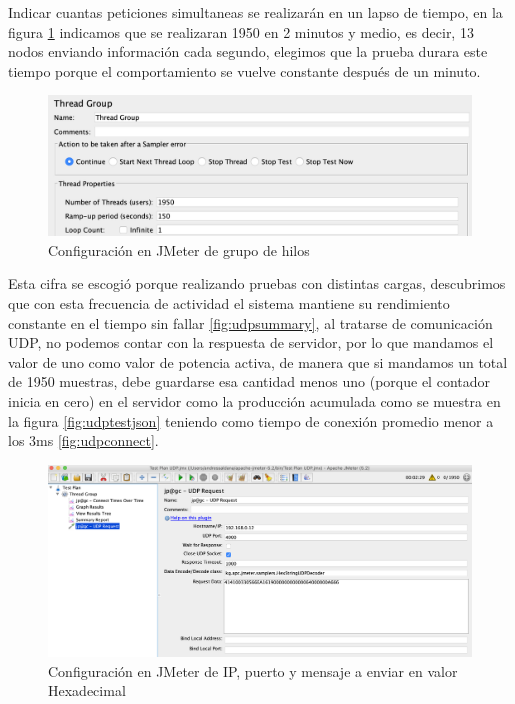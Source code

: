 Indicar cuantas peticiones simultaneas se realizarán en un lapso de tiempo, en la figura \ref{fig:threadgroup} indicamos que se realizaran 1950 en 2 minutos y medio, es decir, 13 nodos enviando información cada segundo, elegimos que la prueba durara este tiempo porque el comportamiento se vuelve constante después de un minuto.

\begin{figure}[H]
	\centering
	\includegraphics[scale=.3]{Capitulo5/images/tread_group.png}
	\caption{Configuración en JMeter de grupo de hilos}
	\label{fig:threadgroup}
\end{figure} 

Esta cifra se escogió porque realizando pruebas con distintas cargas, descubrimos que con esta frecuencia de actividad el sistema mantiene su rendimiento constante en el tiempo sin fallar \ref{fig:udpsummary}, al tratarse de comunicación UDP, no podemos contar con la respuesta de servidor, por lo que mandamos el valor de uno como valor de potencia activa, de manera que si mandamos un total de 1950 muestras, debe guardarse esa cantidad menos uno (porque el contador inicia en cero) en el servidor como la producción acumulada como se muestra en la figura \ref{fig:udptestjson} teniendo como tiempo de conexión promedio menor a los 3ms \ref{fig:udpconnect}.

\begin{figure}[H]
	\centering
	\includegraphics[scale=.3]{Capitulo5/images/udp_test_config.png}
	\caption{Configuración en JMeter de IP, puerto y mensaje a enviar en valor Hexadecimal}
	\label{fig:uddpconfig}
\end{figure} 

